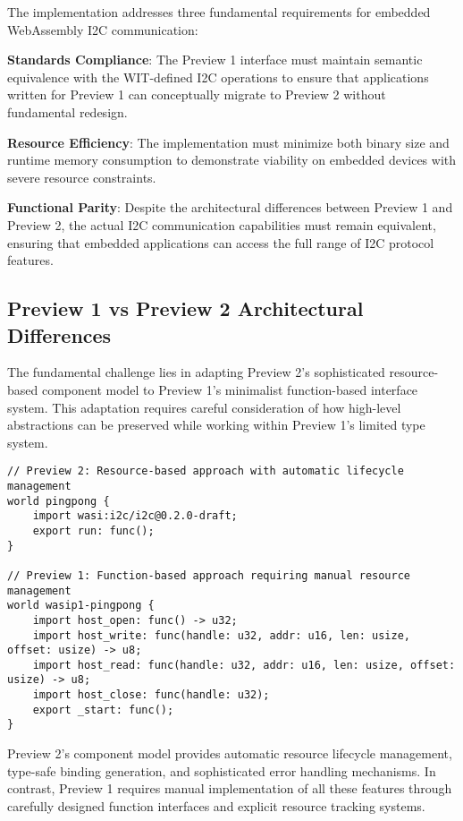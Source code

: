 The implementation addresses three fundamental requirements for embedded WebAssembly I2C communication:

\textbf{Standards Compliance}: The Preview 1 interface must maintain semantic equivalence with the WIT-defined I2C operations to ensure that applications written for Preview 1 can conceptually migrate to Preview 2 without fundamental redesign.

\textbf{Resource Efficiency}: The implementation must minimize both binary size and runtime memory consumption to demonstrate viability on embedded devices with severe resource constraints.

\textbf{Functional Parity}: Despite the architectural differences between Preview 1 and Preview 2, the actual I2C communication capabilities must remain equivalent, ensuring that embedded applications can access the full range of I2C protocol features.

\subsection{Preview 1 vs Preview 2 Architectural Differences}

The fundamental challenge lies in adapting Preview 2's sophisticated resource-based component model to Preview 1's minimalist function-based interface system. This adaptation requires careful consideration of how high-level abstractions can be preserved while working within Preview 1's limited type system.

\begin{verbatim}
// Preview 2: Resource-based approach with automatic lifecycle management
world pingpong {
    import wasi:i2c/i2c@0.2.0-draft;
    export run: func();
}

// Preview 1: Function-based approach requiring manual resource management
world wasip1-pingpong {
    import host_open: func() -> u32;
    import host_write: func(handle: u32, addr: u16, len: usize, offset: usize) -> u8;
    import host_read: func(handle: u32, addr: u16, len: usize, offset: usize) -> u8;
    import host_close: func(handle: u32);
    export _start: func();
}
\end{verbatim}

Preview 2's component model provides automatic resource lifecycle management, type-safe binding generation, and sophisticated error handling mechanisms. In contrast, Preview 1 requires manual implementation of all these features through carefully designed function interfaces and explicit resource tracking systems.

